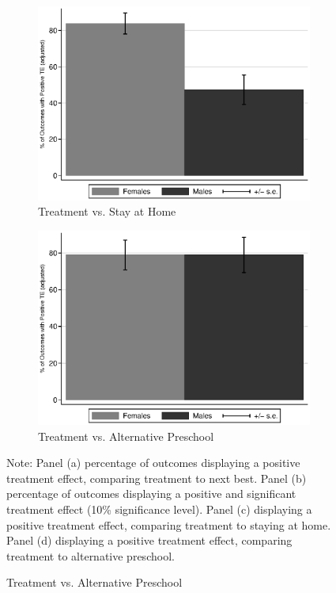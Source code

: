 \begin{figure}
\begin{subfigure}[h]{0.4\textwidth}
		\caption{ Treatment vs. Stay at Home} \label{fig:ppositivehome}
		\includegraphics[width=\textwidth]{output/epan_ipw_p0_all.eps}
\end{subfigure}%
\begin{subfigure}[h]{0.4\textwidth}
	\centering
	\caption{Treatment vs. Alternative Preschool} \label{fig:ppositivealternative}
		\includegraphics[width=\textwidth]{output/epan_ipw_p1_all.eps}
\end{subfigure}
\footnotesize \justify
Note: Panel (a) percentage of outcomes displaying a positive treatment effect, comparing treatment to next best. Panel (b) percentage of outcomes displaying a positive and significant treatment effect (10\% significance level). Panel (c) displaying a positive treatment effect, comparing treatment to staying at home. Panel (d) displaying a positive treatment effect, comparing treatment to alternative preschool.\\
\end{figure}


